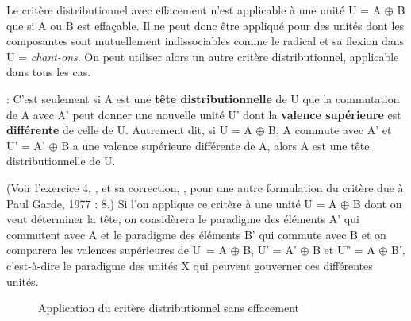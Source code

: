 Le critère distributionnel avec effacement n’est applicable à une unité U = A ${\oplus}$ B que si A ou B est effaçable. Il ne peut donc être appliqué pour des unités dont les composantes sont mutuellement indissociables comme le radical et sa flexion dans U = \textit{chant-ons}. On peut utiliser alors un autre critère distributionnel, applicable dans tous les cas.

\begin{styleLivreImportant}
 : C’est seulement si A est une \textbf{tête distributionnelle} de U que la commutation de A avec A’ peut donner une nouvelle unité U’ dont la \textbf{valence supérieure} est \textbf{différente} de celle de U. Autrement dit, si U = A ${\oplus}$ B, A commute avec A’ et U’ = A’ ${\oplus}$ B a une valence supérieure différente de A, alors A est une tête distributionnelle de U.
\end{styleLivreImportant}

(Voir l’exercice 4, , et sa correction, , pour une autre formulation du critère due à Paul Garde, 1977 : 8.) Si l’on applique ce critère à une unité U = A ${\oplus}$ B dont on veut déterminer la tête, on considèrera le paradigme des éléments A’ qui commutent avec A et le paradigme des éléments B’ qui commute avec B et on comparera les valences supérieures de U~= A ${\oplus}$ B, U’ = A’ ${\oplus}$ B et U” = A ${\oplus}$ B’, c’est-à-dire le paradigme des unités X qui peuvent gouverner ces différentes unités.

\begin{figure}
\caption{\label{fig:}Application du critère distributionnel sans effacement}
\begin{minipage}{.3\textwidth}\centering
\end{minipage}\begin{minipage}{.3\textwidth}\centering
\end{minipage}\begin{minipage}{.3\textwidth}\centering
\end{minipage}
\end{figure}

